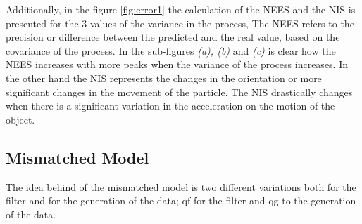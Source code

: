 \documentclass{article}
\begin{document}
        Additionally, in the figure \ref{fig:error1} the calculation of the NEES and the NIS is presented for the 3 values of the variance in the process,
        The NEES refers to the precision or difference between the predicted and the real value, based on the covariance of 
        the process. In the sub-figures \textit{(a), (b)} and \textit{(c)} is clear how the NEES increases with more peaks when the variance of
        the process increases. In the other hand the NIS represents the changes in the orientation or more significant changes in the movement of the particle. The NIS 
        drastically changes when there is a significant variation in the acceleration on the motion of the object.
        
        \subsection{Mismatched Model}

        The idea behind of the mismatched model is two different variations both for the filter and for the generation of the data; qf for the filter and qg to
        the generation of the data.
\end{document}

